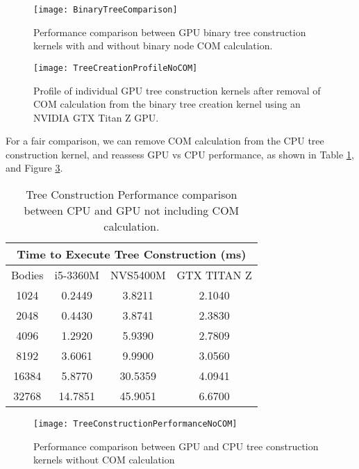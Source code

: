 \documentclass{thesis}
\begin{document}
\begin{figure}[h]
    \caption{Performance comparison between GPU binary tree construction kernels with and without binary node COM calculation.}
    \label{fig:BinaryTreeComparison}
    \centering
    \texttt{[image: BinaryTreeComparison]}
\end{figure}
\begin{figure}[h]
    \caption{Profile of individual GPU tree construction kernels after removal of COM calculation from the binary tree creation kernel using an NVIDIA GTX Titan Z GPU.}
    \label{fig:TreeCreationProfileNoCOM}
    \centering
    \texttt{[image: TreeCreationProfileNoCOM]}
\end{figure}
For a fair comparison, we can remove COM calculation from the CPU tree construction kernel, and reassess GPU vs CPU performance, as shown in Table \ref{tab:treeConstructionPerformanceNoCOM}, and Figure \ref{fig:TreeConstructionPerformanceNoCOM}.
\begin{table}
    \centering
    \caption{Tree Construction Performance comparison between CPU and GPU not including COM calculation.}
    \label{tab:treeConstructionPerformanceNoCOM}
    \begin{tabular}{|c|||c||c|c|}
        \hline
        \multicolumn{4}{|c|}{Time to Execute Tree Construction (ms)}\\
        \hline
        Bodies & i5-3360M & NVS5400M & GTX TITAN Z \\
        \hline
        1024 & 0.2449 & 3.8211 & 2.1040\\
        2048 & 0.4430 & 3.8741 & 2.3830\\
        4096 & 1.2920 & 5.9390 & 2.7809\\
        8192 & 3.6061 & 9.9900 & 3.0560\\
        16384 & 5.8770 & 30.5359 & 4.0941\\
        32768 & 14.7851 & 45.9051 & 6.6700\\
        \hline
    \end{tabular}
\end{table}

\begin{figure}[h]
    \caption{Performance comparison between GPU and CPU tree construction kernels without COM calculation}
    \label{fig:TreeConstructionPerformanceNoCOM}
    \centering
    \texttt{[image: TreeConstructionPerformanceNoCOM]}
\end{figure}
\end{document}

